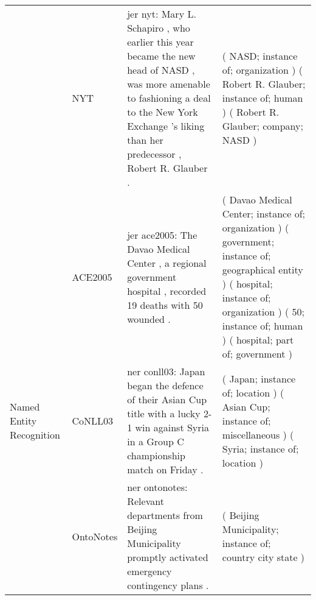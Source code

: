 \begin{table*}[]
{\begin{tabular}{@{}p{2.7cm}lp{10.5cm}p{10.5cm}@{}}
                                                        \\
                                     & NYT              & \quad jer nyt: Mary L. Schapiro , who earlier this year became the new head of {\color{black} NASD} , was more amenable to fashioning a deal to the New York Exchange 's liking than her predecessor , {\color{black} Robert R. Glauber} .
                                                        & ( {\color{orange} NASD}; instance of; {\color{orange} organization} ) ( {\color{orange} Robert R. Glauber}; instance of; {\color{orange} human} ) ( {\color{orange} Robert R. Glauber}; {\color{blue} company}; {\color{orange} NASD} )
                                                        \\
                                     & ACE2005          & \quad jer ace2005: The {\color{black} Davao Medical Center} , a regional {\color{black} government} {\color{black} hospital} , recorded 19 deaths with {\color{black} 50} wounded .
                                                        & ( {\color{orange} Davao Medical Center}; instance of; {\color{orange} organization} ) ( {\color{orange} government}; instance of; {\color{orange} geographical entity} ) ( {\color{orange} hospital}; instance of; {\color{orange} organization} ) ( {\color{orange} 50}; instance of; {\color{orange} human} ) ( {\color{orange} hospital}; {\color{blue} part of}; {\color{orange} government} )
                                                        \\ \midrule
Named Entity Recognition             & CoNLL03          & \quad ner conll03: {\color{black} Japan} began the defence of their {\color{black} Asian Cup} title with a lucky 2-1 win against {\color{black} Syria} in a Group C championship match on Friday .
                                                        & ( {\color{orange} Japan}; instance of; {\color{orange} location} ) ( {\color{orange} Asian Cup}; instance of; {\color{orange} miscellaneous} ) ( {\color{orange} Syria}; instance of; {\color{orange} location} )
                                                        \\
                                     & OntoNotes        & \quad ner ontonotes: Relevant departments from {\color{black} Beijing Municipality} promptly activated emergency contingency plans .
                                                        & ( {\color{orange} Beijing Municipality}; instance of; {\color{orange} country city state} )
                                                        \\

\end{tabular}}
\end{table*}
